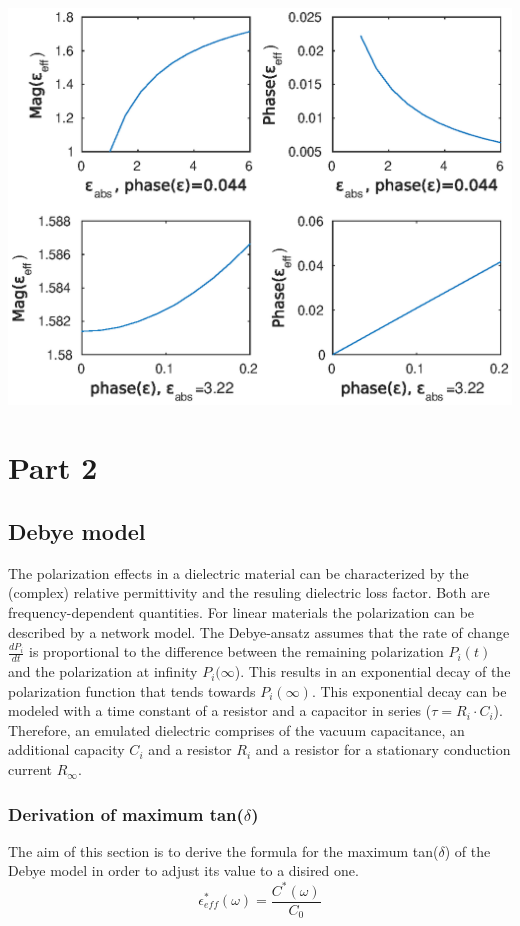 \begin{center}
	\includegraphics[width=\textwidth]{figures/Theory/layeredepsilon.eps}
	
	\end{center}
	
	
	
\section{Part 2}


\subsection{Debye model}
The polarization effects in a dielectric material can be characterized by the (complex) relative permittivity and the resuling dielectric loss factor. Both are frequency-dependent quantities. 
For linear materials the polarization can be described by a network model. The Debye-ansatz assumes that the rate of change $ \frac{dP_i}{dt}$ is proportional to the difference between the remaining polarization $P_i(t)$ and the polarization at infinity $P_i(\infty$). This results in an exponential decay of the polarization function that tends towards $P_i(\infty)$. This exponential decay can be modeled with a time constant of a resistor and a capacitor in series ($\tau=R_i \cdot C_i$). Therefore, an emulated dielectric comprises of the vacuum capacitance, an additional capacity $C_i$ and a resistor $R_i$ and a resistor for a stationary conduction current $R_{\infty}$. 

\subsubsection{Derivation of maximum tan($\delta$)}
The aim of this section is to derive the formula for the maximum tan($\delta$) of the Debye model in order to adjust its value to a disired one.
\begin{equation}
\epsilon_{eff}^* (\omega) = \frac{C^*(\omega)}{C_0}
\end{equation}

